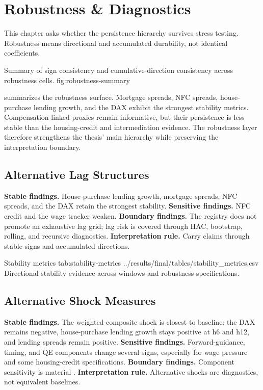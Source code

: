 \chapter{Robustness \& Diagnostics}
\label{chap:robustness}

This chapter asks whether the persistence hierarchy survives stress testing. Robustness means directional and accumulated durability, not identical coefficients.

  {Summary of sign consistency and cumulative-direction consistency across robustness cells.}
  {fig:robustness-summary}

 summarizes the robustness surface. Mortgage spreads, NFC spreads, house-purchase lending growth, and the DAX exhibit the strongest stability metrics. Compensation-linked proxies remain informative, but their persistence is less stable than the housing-credit and intermediation evidence. The robustness layer therefore strengthens the thesis' main hierarchy while preserving the interpretation boundary.

\section{Alternative Lag Structures}

\noindent\textbf{Stable findings.} House-purchase lending growth, mortgage spreads, NFC spreads, and the DAX retain the strongest stability. \textbf{Sensitive findings.} NFC credit and the wage tracker weaken. \textbf{Boundary findings.} The registry does not promote an exhaustive lag grid; lag risk is covered through HAC, bootstrap, rolling, and recursive diagnostics. \textbf{Interpretation rule.} Carry claims through stable signs and accumulated directions.

\artifacttable
  {Stability metrics}
  {tab:stability-metrics}
  {../results/final/tables/stability_metrics.csv}
  {Directional stability evidence across windows and robustness specifications.}

\section{Alternative Shock Measures}

\noindent\textbf{Stable findings.} The weighted-composite shock is closest to baseline: the DAX remains negative, house-purchase lending growth stays positive at h6 and h12, and lending spreads remain positive. \textbf{Sensitive findings.} Forward-guidance, timing, and QE components change several signs, especially for wage pressure and some housing-credit specifications. \textbf{Boundary findings.} Component sensitivity is material \parencite{JarocinskiKaradi2020}. \textbf{Interpretation rule.} Alternative shocks are diagnostics, not equivalent baselines.

